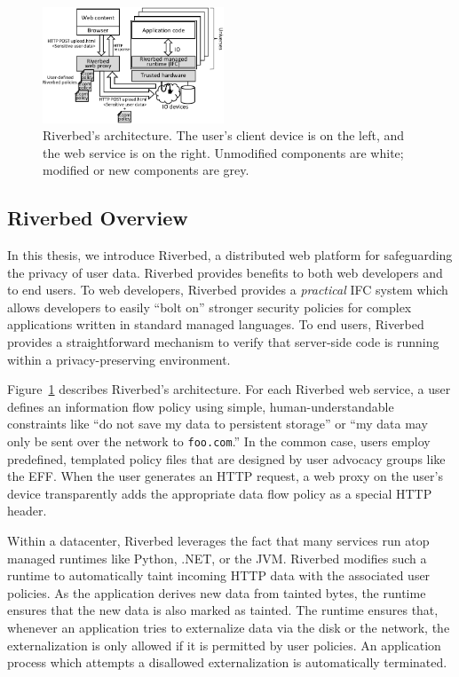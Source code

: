\begin{figure}[t!]
	\centering
	\includegraphics[width=0.48\textwidth]{riverbed-overview.pdf}
	\vspace{-5mm}
	\caption{Riverbed's architecture. The user's
		client device is on the left, and the
		web service is on the right. Unmodified components
		are white; modified or new components are grey.}
	\label{fig:arch}
\end{figure}

\subsection{Riverbed Overview}
In this thesis, we introduce Riverbed, a distributed web platform
for safeguarding the privacy of user data. Riverbed provides
benefits to both web developers and to end users. To web
developers, Riverbed provides a \emph{practical} IFC system
which allows developers to easily ``bolt on'' stronger security
policies for complex applications written in standard managed
languages. To end users, Riverbed provides a straightforward
mechanism to verify that server-side code is running within a
privacy-preserving environment.

Figure~\ref{fig:arch} describes Riverbed's architecture. For each
Riverbed web service, a user defines an information flow policy
using simple, human-understandable constraints like ``do not
save my data to persistent storage'' or ``my data may only be
sent over the network to \texttt{foo.com}.'' In the common case,
users employ predefined, templated policy files that are designed
by user advocacy groups like the EFF. When the user generates
an HTTP request, a web proxy on the user's device transparently
adds the appropriate data flow policy as a special HTTP header. 

Within a datacenter, Riverbed leverages the fact that many
services run atop managed runtimes like Python, .NET, or
the JVM. Riverbed modifies such a runtime to automatically
taint incoming HTTP data with the associated user policies.
As the application derives new data from tainted bytes,
the runtime ensures that the new data is also marked as
tainted. The runtime ensures that, whenever an application
tries to externalize data via the disk or the network, the
externalization is only allowed if it is permitted by user
policies. An application process which attempts a disallowed
externalization is automatically terminated.

